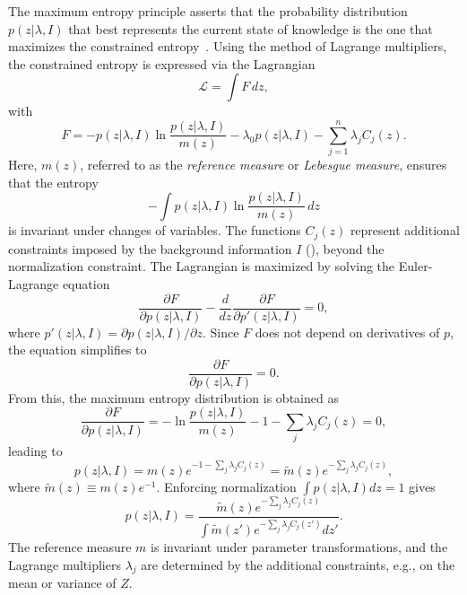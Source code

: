 The maximum entropy principle asserts that the probability distribution $p(z|\lambda, I)$ that best represents the current state of knowledge is the one that maximizes the constrained entropy~\citep{Sivia2006}. Using the method of Lagrange multipliers, the constrained entropy is expressed via the Lagrangian
\begin{equation}
	\mathcal{L} = \int F \, dz,
\end{equation}
with
\begin{equation}
	F = -p(z|\lambda, I) \ln \frac{p(z|\lambda, I)}{m(z)} 
	- \lambda_0 p(z|\lambda, I) - \sum_{j=1}^n \lambda_j C_j(z).
\end{equation}
Here, $m(z)$, referred to as the \emph{reference measure} or \emph{Lebesgue measure}, ensures that the entropy
\begin{equation}
	- \int p(z|\lambda, I) \ln \frac{p(z|\lambda, I)}{m(z)} \, dz
\end{equation}
is invariant under changes of variables. The functions $C_j(z)$ represent additional constraints imposed by the background information $I$ (), beyond the normalization constraint. The Lagrangian is maximized by solving the Euler-Lagrange equation
\begin{equation}
	\frac{\partial F}{\partial p(z|\lambda, I)} - \frac{d}{dz} \frac{\partial F}{\partial p'(z|\lambda, I)} = 0,
\end{equation}
where $p'(z|\lambda, I) = \partial p(z|\lambda, I)/\partial z$. Since $F$ does not depend on derivatives of $p$, the equation simplifies to
\begin{equation}
	\frac{\partial F}{\partial p(z|\lambda, I)} = 0.
\end{equation}
From this, the maximum entropy distribution is obtained as
\begin{equation}
	\frac{\partial F}{\partial p(z|\lambda, I)} = - \ln\frac{p(z|\lambda, I)}{m(z)} - 1 - \sum_j \lambda_j C_j(z) = 0,
\end{equation}
leading to
\begin{equation}
	p(z|\lambda, I) = m(z) e^{-1 - \sum_j \lambda_j C_j(z)} = \tilde{m}(z) e^{- \sum_j \lambda_j C_j(z)},
\end{equation}
where $\tilde{m}(z) \equiv m(z) e^{-1}$. Enforcing normalization $\int p(z|\lambda, I) dz = 1$ gives
\begin{equation}
	p(z|\lambda, I) = \frac{\tilde{m}(z) e^{- \sum_j \lambda_j C_j(z)}}{\int \tilde{m}(z') e^{- \sum_j \lambda_j C_j(z')} dz'}.
\end{equation}
The reference measure $m$ is invariant under parameter transformations, and the Lagrange multipliers $\lambda_j$ are determined by the additional constraints, e.g., on the mean or variance of $Z$.

